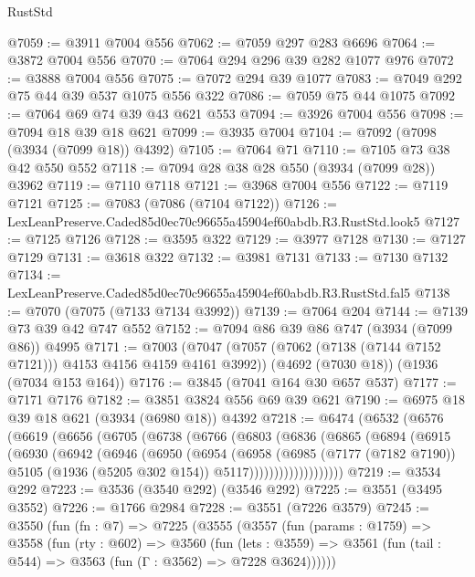 \begin{lexlean}{RustStd}
\begin{coremodule}
@7059 := @3911 @7004 @556
@7062 := @7059 @297 @283 @6696
@7064 := @3872 @7004 @556
@7070 := @7064 @294 @296 @39 @282 @1077 @976
@7072 := @3888 @7004 @556
@7075 := @7072 @294 @39 @1077
@7083 := @7049 @292 @75 @44 @39 @537 @1075 @556 @322
@7086 := @7059 @75 @44 @1075
@7092 := @7064 @69 @74 @39 @43 @621 @553
@7094 := @3926 @7004 @556
@7098 := @7094 @18 @39 @18 @621
@7099 := @3935 @7004
@7104 := @7092 (@7098 (@3934 (@7099 @18)) @4392)
@7105 := @7064 @71
@7110 := @7105 @73 @38 @42 @550 @552
@7118 := @7094 @28 @38 @28 @550 (@3934 (@7099 @28)) @3962
@7119 := @7110 @7118
@7121 := @3968 @7004 @556
@7122 := @7119 @7121
@7125 := @7083 (@7086 (@7104 @7122))
@7126 := LexLeanPreserve.Caded85d0ec70c96655a45904ef60abdb.R3.RustStd.look5
@7127 := @7125 @7126
@7128 := @3595 @322
@7129 := @3977 @7128
@7130 := @7127 @7129
@7131 := @3618 @322
@7132 := @3981 @7131
@7133 := @7130 @7132
@7134 := LexLeanPreserve.Caded85d0ec70c96655a45904ef60abdb.R3.RustStd.fal5
@7138 := @7070 (@7075 (@7133 @7134 @3992))
@7139 := @7064 @204
@7144 := @7139 @73 @39 @42 @747 @552
@7152 := @7094 @86 @39 @86 @747 (@3934 (@7099 @86)) @4995
@7171 := @7003
    (@7047 (@7057 (@7062 (@7138 (@7144 @7152 @7121))) @4153 @4156 @4159 @4161 @3992))
    (@4692 (@7030 @18))
    (@1936 (@7034 @153 @164))
@7176 := @3845 (@7041 @164 @30 @657 @537)
@7177 := @7171 @7176
@7182 := @3851 @3824 @556 @69 @39 @621
@7190 := @6975 @18 @39 @18 @621 (@3934 (@6980 @18)) @4392
@7218 := @6474
    (@6532
      (@6576
        (@6619
          (@6656
            (@6705
              (@6738
                (@6766
                  (@6803
                    (@6836
                      (@6865
                        (@6894
                          (@6915
                            (@6930
                              (@6942
                                (@6946
                                  (@6950
                                    (@6954
                                      (@6958
                                        (@6985
                                          (@7177 (@7182 @7190))
                                          @5105
                                          (@1936 (@5205 @302 @154))
                                          @5117)))))))))))))))))))
@7219 := @3534 @292
@7223 := @3536 (@3540 @292) (@3546 @292)
@7225 := @3551 (@3495 @3552)
@7226 := @1766 @2984
@7228 := @3551 (@7226 @3579)
@7245 := @3550
    (fun (fn : @7) =>
    @7225
      (@3555
        (@3557
          (fun (params : @1759) =>
          @3558
            (fun (rty : @602) =>
            @3560
              (fun (lets : @3559) =>
              @3561 (fun (tail : @544) => @3563 (fun (Γ : @3562) => @7228 @3624))))))

\end{coremodule}
\end{lexlean}
